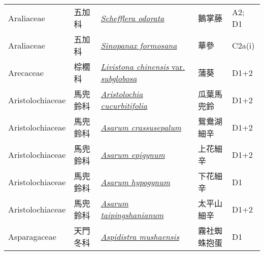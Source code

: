 {\begin{longtable}{p{2.5cm}p{2.5cm}p{4.5cm}p{2.5cm}p{3cm}}
    Araliaceae & 五加科 & \href{http://www.theplantlist.org/tpl1.1/search?q=Schefflera+odorata}{\textit{Schefflera odorata} } & 鵝掌藤 & A2; D1 \index{Schefflera@\textit{Schefflera}!odorata@\textit{odorata}}  \index{鵝掌藤} \\
    Araliaceae & 五加科 & \href{http://www.theplantlist.org/tpl1.1/search?q=Sinopanax+formosana}{\textit{Sinopanax formosana} } & 華參 & C2a(i) \index{Sinopanax@\textit{Sinopanax}!formosana@\textit{formosana}}  \index{華參} \\
    Arecaceae & 棕櫚科 & \href{http://www.theplantlist.org/tpl1.1/search?q=Livistona+chinensis+var.+subglobosa}{\textit{Livistona chinensis} var. \textit{subglobosa} } & 蒲葵 & D1+2 \index{Livistona@\textit{Livistona}!chinensis@\textit{chinensis}!var. subglobosa@var. \textit{subglobosa}}  \index{蒲葵} \\
    Aristolochiaceae & 馬兜鈴科 & \href{http://www.theplantlist.org/tpl1.1/search?q=Aristolochia+cucurbitifolia}{\textit{Aristolochia cucurbitifolia} } & 瓜葉馬兜鈴 & D1+2 \index{Aristolochia@\textit{Aristolochia}!cucurbitifolia@\textit{cucurbitifolia}}  \index{瓜葉馬兜鈴} \\
    Aristolochiaceae & 馬兜鈴科 & \href{http://www.theplantlist.org/tpl1.1/search?q=Asarum+crassusepalum}{\textit{Asarum crassusepalum} } & 鴛鴦湖細辛 & D1+2 \index{Asarum@\textit{Asarum}!crassusepalum@\textit{crassusepalum}}  \index{鴛鴦湖細辛} \\
    Aristolochiaceae & 馬兜鈴科 & \href{http://www.theplantlist.org/tpl1.1/search?q=Asarum+epigynum}{\textit{Asarum epigynum} } & 上花細辛 & D1+2 \index{Asarum@\textit{Asarum}!epigynum@\textit{epigynum}}  \index{上花細辛} \\
    Aristolochiaceae & 馬兜鈴科 & \href{http://www.theplantlist.org/tpl1.1/search?q=Asarum+hypogynum}{\textit{Asarum hypogynum} } & 下花細辛 & D1 \index{Asarum@\textit{Asarum}!hypogynum@\textit{hypogynum}}  \index{下花細辛} \\
    Aristolochiaceae & 馬兜鈴科 & \href{http://www.theplantlist.org/tpl1.1/search?q=Asarum+taipingshanianum}{\textit{Asarum taipingshanianum} } & 太平山細辛 & D1+2 \index{Asarum@\textit{Asarum}!taipingshanianum@\textit{taipingshanianum}}  \index{太平山細辛} \\
    Asparagaceae & 天門冬科 & \href{http://www.theplantlist.org/tpl1.1/search?q=Aspidistra+mushaensis}{\textit{Aspidistra mushaensis} } & 霧社蜘蛛抱蛋 & D1 \index{Aspidistra@\textit{Aspidistra}!mushaensis@\textit{mushaensis}}  \index{霧社蜘蛛抱蛋} \\

\end{longtable}}
